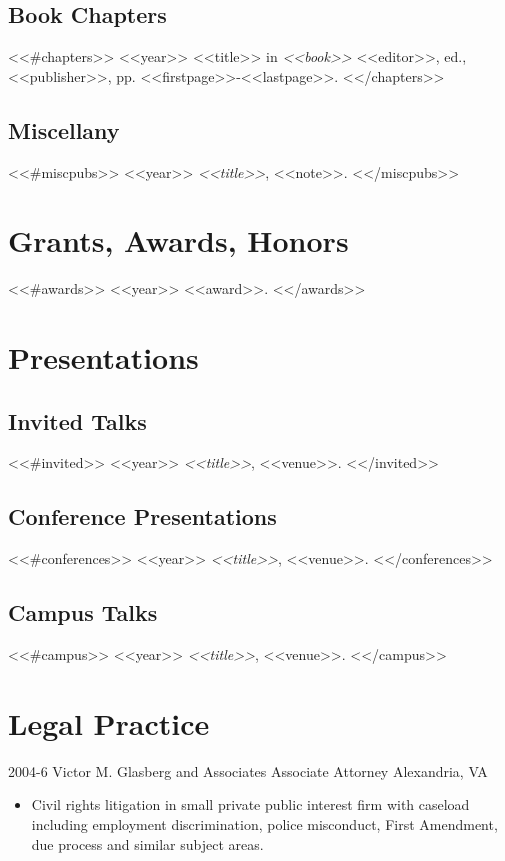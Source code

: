 \documentclass[letterpaper]{moderncv}
\begin{document}
\subsection{Book Chapters}
<<#chapters>>
\cventry
{<<year>>}
{<<title>>}
{}
{in \textit{<<book>>}}
{}
{<<editor>>, ed., <<publisher>>, pp. <<firstpage>>-<<lastpage>>.}
\vspace{1mm}
<</chapters>>
\vspace{1mm}
\subsection{Miscellany}
<<#miscpubs>>
\cvitem
{<<year>>}
{\textit{<<title>>}, <<note>>.}
\vspace{1mm}
<</miscpubs>>


\section{Grants, Awards, Honors}
<<#awards>>
\cvitem
{<<year>>}
{<<award>>.}
\vspace{1mm}
<</awards>>


\section{Presentations}
\subsection{Invited Talks}
<<#invited>>
\cvitem
{<<year>>}
{\textit{<<title>>}, <<venue>>.}
\vspace{1mm}
<</invited>>
\subsection{Conference Presentations}
<<#conferences>>
\cvitem
{<<year>>}
{\textit{<<title>>}, <<venue>>.}
\vspace{1mm}
<</conferences>>
\subsection{Campus Talks}
<<#campus>>
\cvitem
{<<year>>}
{\textit{<<title>>}, <<venue>>.}
\vspace{1mm}
<</campus>>

\section{Legal Practice}

\cventry
{2004-6}
{Victor M. Glasberg and Associates}
{Associate Attorney}
{Alexandria, VA}
{}
{\begin{itemize}%
	\item Civil rights litigation in small private public interest firm with caseload including employment discrimination,
    police misconduct, First Amendment, due process and similar subject areas.
	\end{itemize}}
\end{document}
